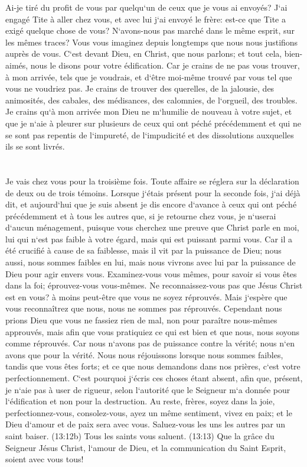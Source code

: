 \verse Ai-je tiré du profit de vous par quelqu`un de ceux que je vous ai envoyés? 
\verse J`ai engagé Tite à aller chez vous, et avec lui j`ai envoyé le frère: est-ce que Tite a exigé quelque chose de vous? N`avons-nous pas marché dans le même esprit, sur les mêmes traces? 
\verse Vous vous imaginez depuis longtemps que nous nous justifions auprès de vous. C`est devant Dieu, en Christ, que nous parlons; et tout cela, bien-aimés, nous le disons pour votre édification. 
\verse Car je crains de ne pas vous trouver, à mon arrivée, tels que je voudrais, et d`être moi-même trouvé par vous tel que vous ne voudriez pas. Je crains de trouver des querelles, de la jalousie, des animosités, des cabales, des médisances, des calomnies, de l`orgueil, des troubles. 
\verse Je crains qu`à mon arrivée mon Dieu ne m`humilie de nouveau à votre sujet, et que je n`aie à pleurer sur plusieurs de ceux qui ont péché précédemment et qui ne se sont pas repentis de l`impureté, de l`impudicité et des dissolutions auxquelles ils se sont livrés. 

\chapter{}

\verse Je vais chez vous pour la troisième fois. Toute affaire se réglera sur la déclaration de deux ou de trois témoins. 
\verse Lorsque j`étais présent pour la seconde fois, j`ai déjà dit, et aujourd`hui que je suis absent je dis encore d`avance à ceux qui ont péché précédemment et à tous les autres que, si je retourne chez vous, je n`userai d`aucun ménagement, 
\verse puisque vous cherchez une preuve que Christ parle en moi, lui qui n`est pas faible à votre égard, mais qui est puissant parmi vous. 
\verse Car il a été crucifié à cause de sa faiblesse, mais il vit par la puissance de Dieu; nous aussi, nous sommes faibles en lui, mais nous vivrons avec lui par la puissance de Dieu pour agir envers vous. 
\verse Examinez-vous vous mêmes, pour savoir si vous êtes dans la foi; éprouvez-vous vous-mêmes. Ne reconnaissez-vous pas que Jésus Christ est en vous? à moins peut-être que vous ne soyez réprouvés. 
\verse Mais j`espère que vous reconnaîtrez que nous, nous ne sommes pas réprouvés. 
\verse Cependant nous prions Dieu que vous ne fassiez rien de mal, non pour paraître nous-mêmes approuvés, mais afin que vous pratiquiez ce qui est bien et que nous, nous soyons comme réprouvés. 
\verse Car nous n`avons pas de puissance contre la vérité; nous n`en avons que pour la vérité. 
\verse Nous nous réjouissons lorsque nous sommes faibles, tandis que vous êtes forts; et ce que nous demandons dans nos prières, c`est votre perfectionnement. 
\verse C`est pourquoi j`écris ces choses étant absent, afin que, présent, je n`aie pas à user de rigueur, selon l`autorité que le Seigneur m`a donnée pour l`édification et non pour la destruction. 
\verse Au reste, frères, soyez dans la joie, perfectionnez-vous, consolez-vous, ayez un même sentiment, vivez en paix; et le Dieu d`amour et de paix sera avec vous. 
\verse Saluez-vous les uns les autres par un saint baiser. 
\verse (13:12b) Tous les saints vous saluent. 
\verse (13:13) Que la grâce du Seigneur Jésus Christ, l`amour de Dieu, et la communication du Saint Esprit, soient avec vous tous! 
